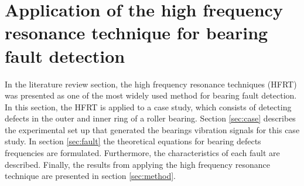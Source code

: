\documentclass[../Main/thesis.tex]{subfiles}
\begin{document}


\clearpage


\section{Application of the high frequency resonance technique for bearing fault detection}
\label{sec:application}
In the literature review section, the high frequency resonance techniques (HFRT) was presented as one of the most widely used method for bearing fault detection. In this section, the HFRT is applied to a case study, which consists of detecting defects in the outer and inner ring of a roller bearing.
\justify
Section \ref{sec:case} describes the experimental set up that generated the bearings vibration signals for this case study. In section \ref{sec:fault} the theoretical equations for bearing defects frequencies are formulated. Furthermore, the characteristics of each fault are described.
Finally, the results from applying the high frequency resonance technique are presented in section \ref{sec:method}.


\end{document}

